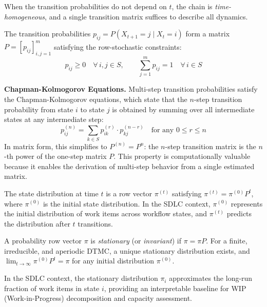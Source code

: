 When the transition probabilities do not depend on $t$, the chain is
\emph{time-homogeneous}, and a single transition matrix suffices to
describe all dynamics.

\begin{definition}
\label{def:transition-matrix}
The transition probabilities $p_{ij} = P(X_{t+1} = j \mid X_t = i)$
form a matrix $P = [p_{ij}]_{i,j=1}^{m}$ satisfying the row-stochastic
constraints:
\begin{equation}
\label{eq:row-stochastic}
p_{ij} \geq 0 \quad \forall\, i,j \in S, \qquad
\sum_{j=1}^{m} p_{ij} = 1 \quad \forall\, i \in S
\end{equation}
\end{definition}

\textbf{Chapman-Kolmogorov Equations.} Multi-step transition
probabilities satisfy the Chapman-Kolmogorov equations, which state that
the $n$-step transition probability from state $i$ to state $j$ is
obtained by summing over all intermediate states at any intermediate
step:
\begin{equation}
\label{eq:chapman-kolmogorov}
p_{ij}^{(n)} = \sum_{k \in S} p_{ik}^{(r)} \cdot p_{kj}^{(n-r)}
\quad \text{for any } 0 \leq r \leq n
\end{equation}
In matrix form, this simplifies to $P^{(n)} = P^n$: the $n$-step
transition matrix is the $n$-th power of the one-step matrix $P$. This
property is computationally valuable because it enables the derivation of
multi-step behavior from a single estimated matrix.

The state distribution at time $t$ is a row vector $\pi^{(t)}$ satisfying
$\pi^{(t)} = \pi^{(0)} P^t$, where $\pi^{(0)}$ is the initial state
distribution. In the SDLC context, $\pi^{(0)}$ represents the initial
distribution of work items across workflow states, and $\pi^{(t)}$
predicts the distribution after $t$ transitions.

\begin{definition}
\label{def:stationary}
A probability row vector $\pi$ is \emph{stationary} (or \emph{invariant})
if $\pi = \pi P$. For a finite, irreducible, and aperiodic DTMC, a unique
stationary distribution exists, and $\lim_{t \to \infty} \pi^{(0)} P^t =
\pi$ for any initial distribution $\pi^{(0)}$.
\end{definition}

In the SDLC context, the stationary distribution $\pi_i$ approximates the
long-run fraction of work items in state $i$, providing an interpretable
baseline for WIP (Work-in-Progress) decomposition and capacity assessment.

